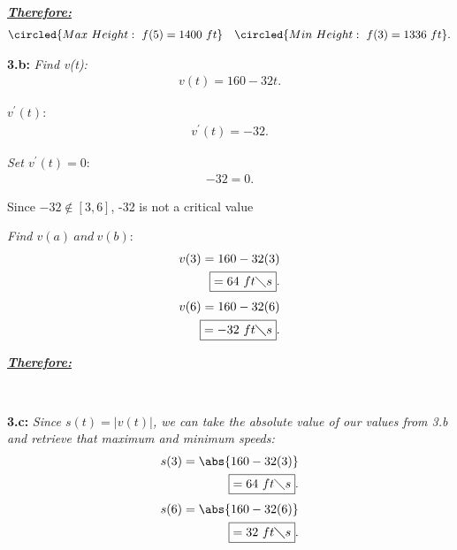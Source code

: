 \documentclass{report}
\begin{document}
\begin{mdframed}
      \bigbreak \noindent 
      \textbf{\textit{\underline{Therefore:}}}
      \begin{align*}
        \circled{Max\ Height:\ f(5) = 1400\ ft}\ \ \  
        \circled{Min\ Height:\ f(3) = 1336\ ft}
      .\end{align*}

      \bigbreak \noindent 
      \hspace{\parindent} \textbf{3.b:}
      \bigbreak \noindent 
      \textit{Find v(t):}
      \begin{align*}
        v(t) = 160-32t
      .\end{align*}

      \bigbreak \noindent 
      \textit{$v^{\prime}(t)$}:
      \begin{align*}
        v^{\prime}(t) = -32
      .\end{align*}

      \bigbreak \noindent 
      \textit{Set $v^{\prime}(t) =0 $}:
      \begin{align*}
        -32 = 0
      .\end{align*}
          \begin{center}
      Since $-32 \notin [3,6]$, -32 is not a critical value
    \end{center}

    \bigbreak \noindent 
    \textit{Find $v(a)\ and\ v(b)$}:
    \begin{align*}
      v(3) = 160-32(3) \\
      \boxed{=64\ ft \diagdown s}
    .\end{align*}
    \begin{align*}
      v(6) = 160-32(6) \\
      \boxed{=-32\ ft \diagdown s}
    .\end{align*}

    \bigbreak \noindent 
    \textbf{\textit{\underline{Therefore:}}}
    \bigbreak \noindent 
    \begin{center}
      \ \ \ 
    \end{center}

    \bigbreak \noindent 
    \hspace{\parindent} \textbf{3.c:}
    \bigbreak \noindent 
    \textit{Since $ s(t) = |v(t)|$, we can take the absolute value of our values from 3.b and retrieve that maximum and minimum speeds:}
    \begin{align*}
      s(3) = \abs{160-32(3)} \\
      \boxed{=64\ ft \diagdown s}
    .\end{align*}
    \begin{align*}
      s(6) = \abs{160 -32(6)} \\
      \boxed{=32\ ft \diagdown s}
    .\end{align*}


\end{mdframed}
\end{document}
